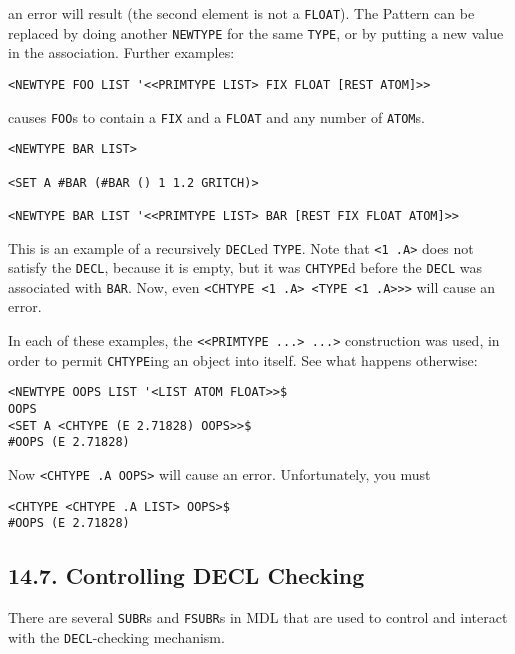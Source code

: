 \documentclass[a4paper,]{article}
\begin{document}
an error will result (the second element is not a \texttt{FLOAT}). The Pattern can be replaced by doing another
\texttt{NEWTYPE} for the same \texttt{TYPE}, or by putting a new value in the association. Further examples:

\begin{verbatim}
<NEWTYPE FOO LIST '<<PRIMTYPE LIST> FIX FLOAT [REST ATOM]>>
\end{verbatim}

causes \texttt{FOO}s to contain a \texttt{FIX} and a \texttt{FLOAT} and any number of \texttt{ATOM}s.

\begin{verbatim}
<NEWTYPE BAR LIST>

<SET A #BAR (#BAR () 1 1.2 GRITCH)>

<NEWTYPE BAR LIST '<<PRIMTYPE LIST> BAR [REST FIX FLOAT ATOM]>>
\end{verbatim}

This is an example of a recursively \texttt{DECL}ed \texttt{TYPE}. Note that \texttt{\textless{}1\ .A\textgreater{}} does
not satisfy the \texttt{DECL}, because it is empty, but it was \texttt{CHTYPE}d before the \texttt{DECL} was associated
with \texttt{BAR}. Now, even
\texttt{\textless{}CHTYPE\ \textless{}1\ .A\textgreater{}\ \textless{}TYPE\ \textless{}1\ .A\textgreater{}\textgreater{}\textgreater{}}
will cause an error.

In each of these examples, the \texttt{\textless{}\textless{}PRIMTYPE\ ...\textgreater{}\ ...\textgreater{}} construction
was used, in order to permit \texttt{CHTYPE}ing an object into itself. See what happens otherwise:

\begin{verbatim}
<NEWTYPE OOPS LIST '<LIST ATOM FLOAT>>$
OOPS
<SET A <CHTYPE (E 2.71828) OOPS>>$
#OOPS (E 2.71828)
\end{verbatim}

Now \texttt{\textless{}CHTYPE\ .A\ OOPS\textgreater{}} will cause an error. Unfortunately, you must

\begin{verbatim}
<CHTYPE <CHTYPE .A LIST> OOPS>$
#OOPS (E 2.71828)
\end{verbatim}

\subsection{14.7. Controlling DECL Checking}\label{controlling-decl-checking}

There are several \texttt{SUBR}s and \texttt{FSUBR}s in MDL that are used to control and interact with the
\texttt{DECL}-checking mechanism.
\end{document}
